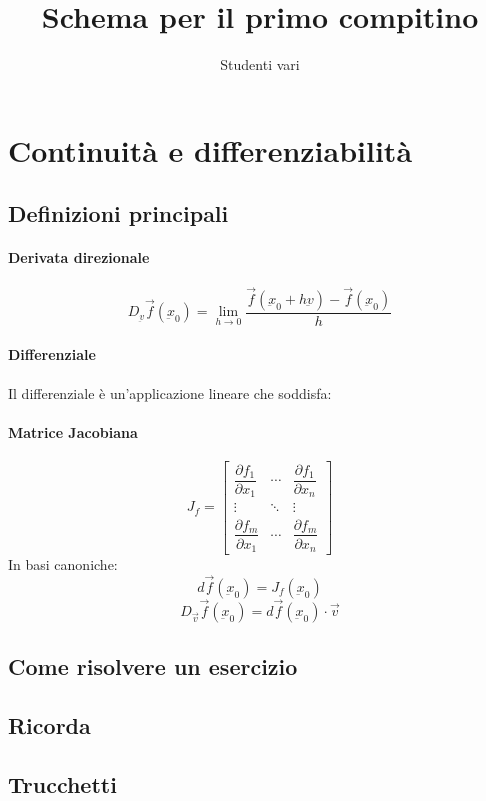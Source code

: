 \documentclass[a4paper,10pt]{book}
\author{Studenti vari}
\title{Schema per il primo compitino}
\begin{document}
\maketitle

\section{Continuità e differenziabilità}
\subsection{Definizioni principali}
\paragraph{Derivata direzionale}
$$D_{\underbar{v}} \vec{f}(\underbar{x}_0) = \lim_{h \to 0}{\dfrac{\vec{f}(\underbar{x}_0+h\underbar{v})-\vec{f}(\underbar{x}_0)}{h}}$$
\paragraph{Differenziale}
Il differenziale è un'applicazione lineare che soddisfa:

\paragraph{Matrice Jacobiana}
$$J_f = \begin{bmatrix} \dfrac{\partial f_1}{\partial x_1} & \cdots & \dfrac{\partial f_1}{\partial x_n} \\ \vdots & \ddots & \vdots \\ \dfrac{\partial f_m}{\partial x_1} & \cdots & \dfrac{\partial f_m}{\partial x_n}  \end{bmatrix}$$
In basi canoniche:
$$ d\vec{f}(\underbar{x}_0)= J_f(\underbar{x}_0) $$
$$D_{\vec{v}} \vec{f}(\underbar{x}_0) = d\vec{f}(\underbar{x}_0)\cdot\vec{v}$$
\subsection{Come risolvere un esercizio}

\subsection{Ricorda}

\subsection{Trucchetti}
\end{document}
